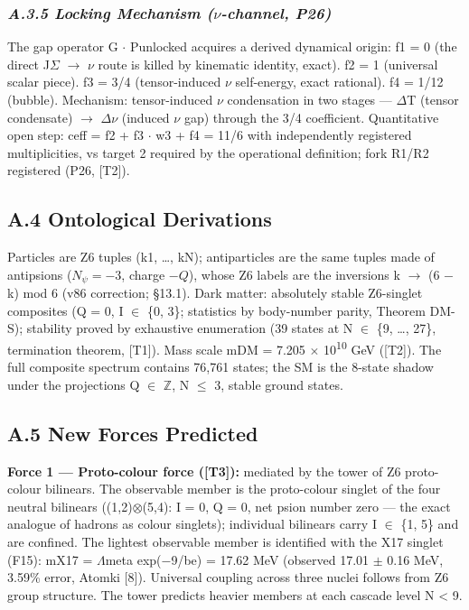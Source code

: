 \documentclass[11pt,letterpaper]{article}
\begin{document}
\subsubsection*{\itshape A.3.5  Locking Mechanism ($\nu$-channel, P26)}

\noindent The gap operator G $\cdot$ Punlocked acquires a derived dynamical origin: f1 = 0 (the direct J$\Sigma$ $\to$ $\nu$ route is killed by kinematic identity, exact). f2 = 1 (universal scalar piece). f3 = 3/4 (tensor-induced $\nu$ self-energy, exact rational). f4 = 1/12 (bubble). Mechanism: tensor-induced $\nu$ condensation in two stages --- $\Delta$T (tensor condensate) $\to$ $\Delta$$\nu$ (induced $\nu$ gap) through the 3/4 coefficient. Quantitative open step: ceff = f2 + f3 $\cdot$ w3 + f4 = 11/6 with independently registered multiplicities, vs target 2 required by the operational definition; fork R1/R2 registered (P26, [T2]).

\subsection*{A.4  Ontological Derivations}

\noindent Particles are Z6 tuples (k1, \ldots{}, kN); antiparticles are the same tuples made of antipsions ($N_\psi=-3$, charge $-Q$), whose Z6 labels are the inversions k $\to$ (6 $-$ k) mod 6 (v86 correction; §13.1). Dark matter: absolutely stable Z6-singlet composites (Q = 0, I $\in$ \{0, 3\}; statistics by body-number parity, Theorem DM-S); stability proved by exhaustive enumeration (39 states at N $\in$ \{9, \ldots{}, 27\}, termination theorem, [T1]). Mass scale mDM = 7.205 $\times$ 10\textsuperscript{10} GeV ([T2]). The full composite spectrum contains 76,761 states; the SM is the 8-state shadow under the projections Q $\in$ $\mathbb{Z}$, N $\le$ 3, stable ground states.

\subsection*{A.5  New Forces Predicted}

\noindent \textbf{Force 1 --- Proto-colour force ([T3]): }mediated by the tower of Z6 proto-colour bilinears. The observable member is the proto-colour singlet of the four neutral bilinears ((1,2)$\otimes$(5,4): I = 0, Q = 0, net psion number zero --- the exact analogue of hadrons as colour singlets); individual bilinears carry I $\in$ \{1, 5\} and are confined. The lightest observable member is identified with the X17 singlet (F15): mX17 = $\Lambda$meta exp($-$9/be) = 17.62 MeV (observed 17.01 $\pm$ 0.16 MeV, 3.59\% error, Atomki [8]). Universal coupling across three nuclei follows from Z6 group structure. The tower predicts heavier members at each cascade level N < 9.
\end{document}
